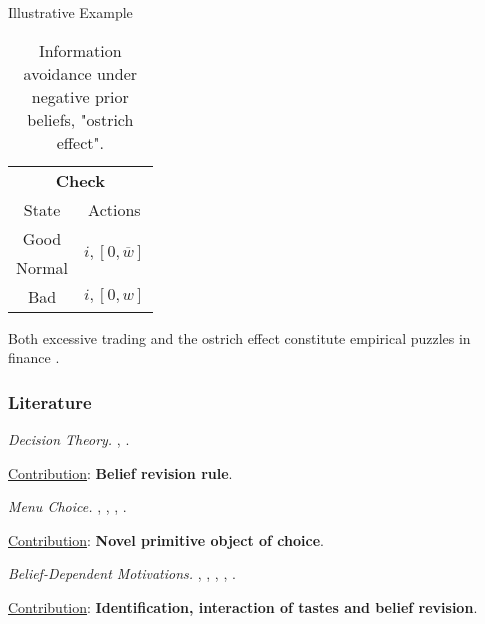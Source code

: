 \documentclass[usenames,dvipsnames,aspectratio=169,11pt, envcountsect, handout]{beamer}
\begin{document}
\begin{frame}[noframenumbering]{Illustrative Example}
\begin{table}[H]
\begin{minipage}{0.29\textwidth}
			\centering
			\begin{tabular}{c | c}
				\multicolumn{2}{c}{\textbf{Check}}                                                            \\
				State                & Actions                                                                \\
				\hline
				{\color{blue}Good}   & \multirow{2}{*}{{\color{blue}\( i, \left[ 0, \overline{w} \right] \)}} \\
				{\color{blue}Normal} &                                                                        \\
				Bad                  & \(  i, \left[0, w \right] \)                                           \\
			\end{tabular}
			\vspace{0.5cm} %
		\end{minipage}
		\caption{Information avoidance under negative prior beliefs, "ostrich effect".} %
		\label{tab:oistrich}
	\end{table}

	Both excessive trading and the ostrich effect constitute empirical puzzles in finance \citep{danielOverconfidentInvestorsPredictable2015,golmanInformationAvoidance2017}.

\end{frame}

\begin{frame}\frametitle{Literature}

	\begin{wideitemize}
		\item \textit{Decision Theory.} \cite{liangInformationdependentExpectedUtility2017}, \cite{dillenbergerAdditivebeliefbasedPreferences2020} \cite{rommeswinkelPreferenceKnowledge2023}.

		\vspace{0.3cm}
		\underline{Contribution}: \textbf{Belief revision rule}.
		\item \textit{Menu Choice.} \cite{gulTemptationSelfControl2001}, \cite{ozdenorenCompletingStateSpace2002}, \cite{epsteinAxiomaticModelNonBayesian2006}, \cite{epsteinColdFeet2007}.

		\vspace{0.3cm}
		\underline{Contribution}: \textbf{Novel primitive object of choice}.
		\item \textit{Belief-Dependent Motivations.} \cite{brunnermeierOptimalExpectations2005}, \cite{eliazCanAnticipatoryFeelings2006}, \cite{benabou2016mindful}, \cite{golmanInformationAvoidance2017}, \cite{battigalliBeliefdependentMotivationsPsychological2022}.

		\vspace{0.3cm}
		\underline{Contribution}: \textbf{Identification, interaction of tastes and belief revision}.
	\end{wideitemize}

\end{frame}
\end{document}
